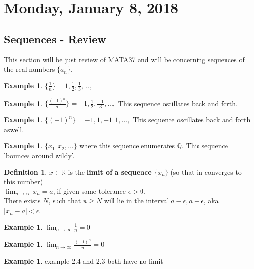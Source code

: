 \documentclass[12pt]{article}
\theoremstyle{plain}
\theoremstyle{definition}
\newtheorem{definition}[theorem]{Definition}
\newtheorem{example}[theorem]{Example}
\begin{document}
\newpage

\section{Monday, January 8, 2018}

\subsection{Sequences - Review}

This section will be just review of MATA37 and will be concerning sequences of the real numbers $\{ a_n \}$.

\begin{example}
    $\{ \frac{1}{n} \} = 1,\frac{1}{2}, \frac{1}{3}, ..., $
\end{example}

\begin{example}
    $\{ \frac{(-1)^n}{n} \} = -1,\frac{1}{2}, \frac{-1}{3}, ..., $ This sequence oscillates back and forth.
\end{example}

\begin{example}
    $\{ (-1)^n \} = -1,1,-1,1, ..., $ This sequence oscillates back and forth aswell.
\end{example}

\begin{example}
    $\{ x_1, x_2, ...  \}$ where this sequence enumerates $\mathbb{Q}$. This sequence 'bounces around wildy'.
\end{example}

\begin{definition}
    $x\in\mathbb{R}$ is the \textbf{limit of a sequence $\{x_n \}$} (so that in converges to this number)\\
    $\lim_{n\to\infty} x_n = a$, if given some tolerance $\epsilon > 0$.\\
    There exists $N$, such that $n \geq N$ will lie in the interval $a-\epsilon, a+\epsilon$, aka $|x_n - a| < \epsilon$.
\end{definition}

\begin{example}
    $\lim_{n\to\infty} \frac{1}{n} = 0$
\end{example}

\begin{example}
    $\lim_{n\to\infty} \frac{(-1)^n}{n} = 0$
\end{example}

\begin{example}
    example 2.4 and 2.3 both have no limit
\end{example}
\end{document}
